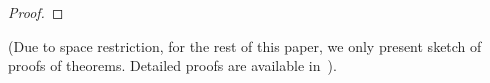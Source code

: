 \begin{proof}
%
\end{proof}
(Due to space restriction, for the rest of this paper, we only present
sketch of proofs of theorems. Detailed proofs are available
in~\cite{thesis/hudon2011}).


